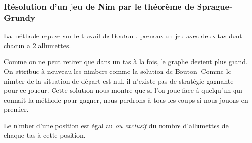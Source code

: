 \documentclass{beamer}
\begin{document}
  \begin{frame}
  \frametitle{Résolution d'un jeu de Nim par le théorème de Sprague-Grundy}
     {La méthode repose sur le travail de Bouton : prenons un jeu avec deux tas dont chacun a 2 allumettes.}

     {Comme on ne peut retirer que dans un tas à la fois, le graphe devient plus grand.}
     {On attribue à nouveau les nimbers comme la solution de Bouton.}
     {Comme le nimber de la situation de départ est nul, il n'existe pas de stratégie gagnante pour ce joueur.}
     {Cette solution nous montre que si l'on joue face à quelqu'un qui connait la méthode pour gagner, nous perdrons à tous les coups si nous jouons en premier.}
     {
      \begin{figure}[h]
        \centering
      \end{figure}
    }


     {Le nimber d'une position est égal au \textit{ou exclusif} du nombre d'allumettes de chaque tas à cette position.}
  \end{frame}
\end{document}
